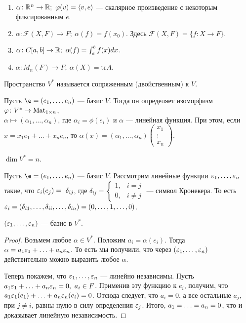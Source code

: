 \begin{Examples}\
\begin{enumerate}
\item $\alpha \colon \R^n \rightarrow \R;\ \phi(v) = \langle v, e \rangle$ --- скалярное произведение с некоторым фиксированным $e$.
\item $\alpha \colon \mathcal{F}(X, F) \rightarrow F;\ \alpha(f) = f(x_0)$. Здесь $\mathcal{F}(X, F) = \{f \colon X \rightarrow F  \}$.
\item $\alpha \colon C[a, b] \rightarrow \R;\ \alpha(f) = \int_a^b f(x) dx$.
\item $\alpha \colon M_n(F) \rightarrow F;\ \alpha(X) = \mathrm{tr}A$.
\end{enumerate}
\end{Examples}

\begin{Def}
Пространство $V^*$ называется сопряженным (двойственным) к $V$.
\end{Def}

Пусть $\e = (e_1, \ldots, e_n)$ --- базис $V$. Тогда он определяет изоморфизм $\varphi \colon V^* \to \mathrm{Mat}_{1\times n}$, \\$\alpha \mapsto (\alpha_1, \ldots, \alpha_n)$, где $\alpha_i = \phi(e_i)$ и $\alpha$ --- линейная функция. При этом, если $x = x_1e_1 + \ldots + x_ne_n$, то $\alpha(x) = (\alpha_1, \ldots, \alpha_n)\begin{pmatrix}x_1\\ \vdots \\ x_n\end{pmatrix}$.

\begin{Consequence}
$\dim V^* = n$.
\end{Consequence}

Пусть $\e = (e_1, \ldots, e_n)$ --- базис $V$. Рассмотрим линейные функции $\varepsilon_1, \ldots, \varepsilon_n$ такие, что $\varepsilon_i(e_j) =~\delta_{ij}$, где $\delta_{ij} =
\begin{cases}
1, & i = j \\
0, & i \neq j
\end{cases}
$ --- символ Кронекера. То есть $\varepsilon_i = (\delta_{i1}, \ldots, \delta_{ii}, \ldots, \delta_{in}) = (0, \ldots, 1, \ldots, 0)$.

\begin{Suggestion}
$(\varepsilon_1, \ldots, \varepsilon_n)$ --- базис в $V^*$.
\end{Suggestion}

\begin{proof}
Возьмем любое $\alpha \in V^*$. Положим $a_i = \alpha(e_i)$. Тогда $\alpha = a_1\varepsilon_1 + \ldots + a_n\varepsilon_n$. То есть мы получили, что через $(\varepsilon_1, \ldots, \varepsilon_n)$ действительно можно выразить любое $\alpha$.

Теперь покажем, что $\varepsilon_1, \ldots, \varepsilon_n$ --- линейно независимы. Пусть $a_1\varepsilon_1 + \ldots + a_n\varepsilon_n = 0,\ a_i \in F$. Применив эту функцию к $e_i$, получим, что $a_1\varepsilon_1(e_1) + \ldots + a_n\varepsilon_n(e_i) = 0$. Отсюда следует, что $a_i = 0$, а все остальные $a_j$, при $j \neq i$, равны нулю в силу определения $\varepsilon_j$. Итого, $a_1 = \ldots \hm= a_n = 0$, что и доказывает линейную независимость.
\end{proof}

